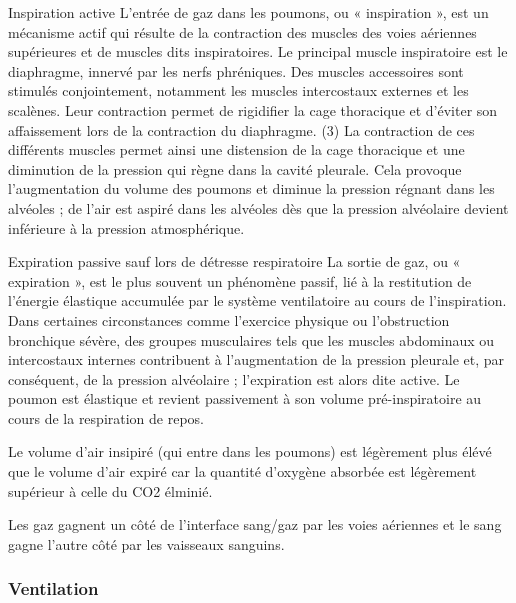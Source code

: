 \documentclass[12pt,]{article}
\begin{document}
Inspiration active L'entrée de gaz dans les poumons, ou « inspiration »,
est un mécanisme actif qui résulte de la contraction des muscles des
voies aériennes supérieures et de muscles dits inspiratoires. Le
principal muscle inspiratoire est le diaphragme, innervé par les nerfs
phréniques. Des muscles accessoires sont stimulés conjointement,
notamment les muscles intercostaux externes et les scalènes. Leur
contraction permet de rigidifier la cage thoracique et d'éviter son
affaissement lors de la contraction du diaphragme. (3) La contraction de
ces différents muscles permet ainsi une distension de la cage thoracique
et une diminution de la pression qui règne dans la cavité pleurale. Cela
provoque l'augmentation du volume des poumons et diminue la pression
régnant dans les alvéoles ; de l'air est aspiré dans les alvéoles dès
que la pression alvéolaire devient inférieure à la pression
atmosphérique.

Expiration passive sauf lors de détresse respiratoire La sortie de gaz,
ou « expiration », est le plus souvent un phénomène passif, lié à la
restitution de l'énergie élastique accumulée par le système ventilatoire
au cours de l'inspiration. Dans certaines circonstances comme l'exercice
physique ou l'obstruction bronchique sévère, des groupes musculaires
tels que les muscles abdominaux ou intercostaux internes contribuent à
l'augmentation de la pression pleurale et, par conséquent, de la
pression alvéolaire ; l'expiration est alors dite active. Le poumon est
élastique et revient passivement à son volume pré-inspiratoire au cours
de la respiration de repos.

Le volume d'air insipiré (qui entre dans les poumons) est légèrement
plus élévé que le volume d'air expiré car la quantité d'oxygène absorbée
est légèrement supérieur à celle du CO2 élminié.

Les gaz gagnent un côté de l'interface sang/gaz par les voies aériennes
et le sang gagne l'autre côté par les vaisseaux sanguins.

\hypertarget{ventilation}{%
\subsubsection{Ventilation}\label{ventilation}}
\end{document}
